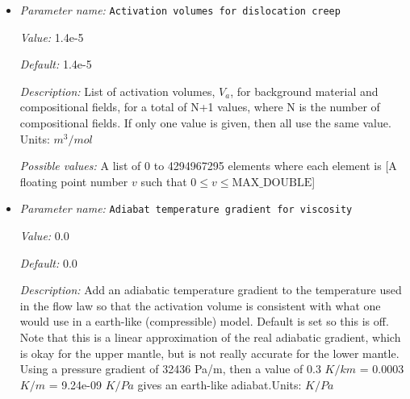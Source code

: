 \begin{itemize}
{\it Value:} 6e-6


{\it Default:} 6e-6


{\it Description:} List of activation volumes, $V_a$, for background material and compositional fields, for a total of N+1 values, where N is the number of compositional fields. If only one value is given, then all use the same value.  Units: $m^3 / mol$


{\it Possible values:} A list of 0 to 4294967295 elements where each element is [A floating point number $v$ such that $0 \leq v \leq \text{MAX\_DOUBLE}$]
\item {\it Parameter name:} {\tt Activation volumes for dislocation creep}
\label{parameters:Material model/Visco Plastic/Activation volumes for dislocation creep}


{\it Value:} 1.4e-5


{\it Default:} 1.4e-5


{\it Description:} List of activation volumes, $V_a$, for background material and compositional fields, for a total of N+1 values, where N is the number of compositional fields. If only one value is given, then all use the same value.  Units: $m^3 / mol$


{\it Possible values:} A list of 0 to 4294967295 elements where each element is [A floating point number $v$ such that $0 \leq v \leq \text{MAX\_DOUBLE}$]
\item {\it Parameter name:} {\tt Adiabat temperature gradient for viscosity}
\label{parameters:Material model/Visco Plastic/Adiabat temperature gradient for viscosity}


{\it Value:} 0.0


{\it Default:} 0.0


{\it Description:} Add an adiabatic temperature gradient to the temperature used in the flow law so that the activation volume is consistent with what one would use in a earth-like (compressible) model. Default is set so this is off. Note that this is a linear approximation of the real adiabatic gradient, which is okay for the upper mantle, but is not really accurate for the lower mantle. Using a pressure gradient of 32436 Pa/m, then a value of 0.3 $K/km$ = 0.0003 $K/m$ = 9.24e-09 $K/Pa$ gives an earth-like adiabat.Units: $K/Pa$



\end{itemize}
